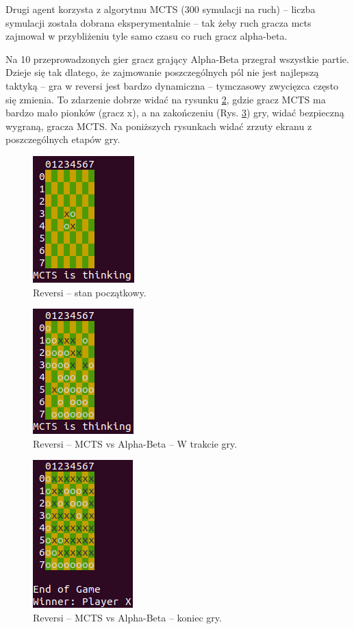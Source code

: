 \documentclass[polish,shortabstract,inz]{iithesis}
\begin{document}
Drugi agent korzysta z algorytmu MCTS (300 symulacji na ruch) -- liczba symulacji została dobrana eksperymentalnie -- tak żeby ruch gracza mcts zajmował w przybliżeniu tyle samo czasu co ruch gracz alpha-beta.

Na 10 przeprowadzonych gier gracz grający Alpha-Beta przegrał wszystkie partie.
Dzieje się tak dlatego, że zajmowanie poszczególnych pól nie jest najlepszą taktyką -- gra w reversi jest bardzo dynamiczna -- tymczasowy zwycięzca często się zmienia.
To zdarzenie dobrze widać na rysunku \ref{fig:rev_mid}, gdzie gracz MCTS ma bardzo mało pionków (gracz x), a na zakończeniu (Rys. \ref{fig:rev_end}) gry, widać bezpieczną wygraną, gracza MCTS.
Na poniższych rysunkach widać zrzuty ekranu z poszczególnych etapów gry.


\begin{figure}[H]
  \includegraphics[scale=0.8]{./images/reversistart.png}
  \centering
  \caption{Reversi -- stan początkowy.}
  \label{fig:rev_start}
\end{figure}

\begin{figure}[H]
  \includegraphics[scale=0.8]{./images/reversimid.png}
  \centering
  \caption{Reversi -- MCTS vs Alpha-Beta -- W trakcie gry.}
  \label{fig:rev_mid}
\end{figure}

\begin{figure}[H]
  \includegraphics[scale=0.8]{./images/reversiend.png}
  \centering
  \caption{Reversi -- MCTS vs Alpha-Beta -- koniec gry.}
  \label{fig:rev_end}
\end{figure}
\end{document}
